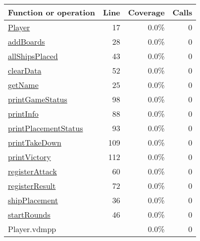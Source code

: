 \begin{longtable}{|l|r|r|r|}
\hline
Function or operation & Line & Coverage & Calls \\
\hline
\hline
\hyperref[Player:17]{Player} & 17&0.0\% & 0 \\
\hline
\hyperref[addBoards:28]{addBoards} & 28&0.0\% & 0 \\
\hline
\hyperref[allShipsPlaced:43]{allShipsPlaced} & 43&0.0\% & 0 \\
\hline
\hyperref[clearData:52]{clearData} & 52&0.0\% & 0 \\
\hline
\hyperref[getName:25]{getName} & 25&0.0\% & 0 \\
\hline
\hyperref[printGameStatus:98]{printGameStatus} & 98&0.0\% & 0 \\
\hline
\hyperref[printInfo:88]{printInfo} & 88&0.0\% & 0 \\
\hline
\hyperref[printPlacementStatus:93]{printPlacementStatus} & 93&0.0\% & 0 \\
\hline
\hyperref[printTakeDown:109]{printTakeDown} & 109&0.0\% & 0 \\
\hline
\hyperref[printVictory:112]{printVictory} & 112&0.0\% & 0 \\
\hline
\hyperref[registerAttack:60]{registerAttack} & 60&0.0\% & 0 \\
\hline
\hyperref[registerResult:72]{registerResult} & 72&0.0\% & 0 \\
\hline
\hyperref[shipPlacement:36]{shipPlacement} & 36&0.0\% & 0 \\
\hline
\hyperref[startRounds:46]{startRounds} & 46&0.0\% & 0 \\
\hline
\hline
Player.vdmpp & & 0.0\% & 0 \\
\hline
\end{longtable}

